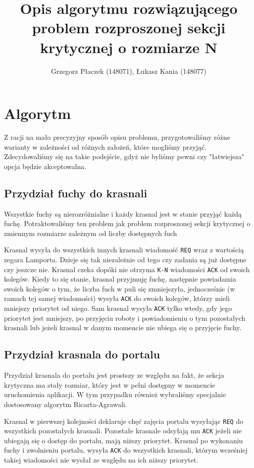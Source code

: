 \documentclass{article}
\author{Grzegorz Płaczek (148071), Łukasz Kania (148077)}
\title{Opis algorytmu rozwiązującego problem rozproszonej sekcji krytycznej o rozmiarze N}
\begin{document}
    \maketitle

    \section{Algorytm}

    Z racji na mało precyzyjny sposób opisu problemu, przygotowaliśmy różne warianty w zależności od różnych założeń, które mogliśmy przyjąć.
    Zdecydowaliśmy się na takie podejście, gdyż nie byliśmy pewni czy "łatwiejsza" opcja będzie akceptowalna.

    \subsection{Przydział fuchy do krasnali}

    Wszystkie fuchy są nierozróżnialne i każdy krasnal jest w stanie przyjąć każdą fuchę.
    Potraktowaliśmy ten problem jak problem rozproszonej sekcji krytycznej o zmiennym rozmiarze zależnym od liczby dostępnych fuch

    Krasnal wysyła do wszystkich innych krasnali wiadomość \texttt{REQ} wraz z wartością zegara Lamporta.
    Dzieje się tak niezależnie od tego czy zadania są już dostępne czy jeszcze nie.
    Krasnal czeka dopóki nie otrzyma \texttt{K-N} wiadomości \texttt{ACK} od swoich kolegów.
    Kiedy to się stanie, krasnal przyjmuję fuchę, następnie powiadamia swoich kolegów o tym, że liczba fuch w puli się zmniejszyła, jednocześnie (w ramach tej samej wiadomości) wysyła \texttt{ACK} do swoich kolegów, którzy mieli mniejszy priorytet od niego.
    Sam krasnal wysyła \texttt{ACK} tylko wtedy, gdy jego priorytet jest mniejszy, po przyjęciu roboty i powiadomieniu o tym pozostałych krasnali lub jeżeli krasnal w danym momencie nie ubiega się o przyjęcie fuchy.

    \subsection{Przydział krasnala do portalu}

    Przydział krasnala do portalu jest prostszy ze względu na fakt, że sekcja krytyczna ma stały rozmiar, który jest w pełni dostępny w momencie uruchomienia aplikacji.
    W tym przypadku również wybraliśmy specjalnie dostosowany algorytm Ricarta-Agrawali.

    Krasnal w pierwszej kolejności deklaruje chęć zajęcia portalu wysyłając \texttt{REQ} do wszystkich pozostałych krasnali.
    Pozostałe krasnale odsyłają mu \texttt{ACK} jeżeli nie ubiegają się o dostęp do portalu, mają niższy priorytet.
    Krasnal po wykonaniu fuchy i zwolnieniu portalu, wysyła \texttt{ACK} do wszystkich krasnali, którym wcześniej takiej wiadomości nie wysłał ze względu na ich niższy priorytet.
\end{document}
